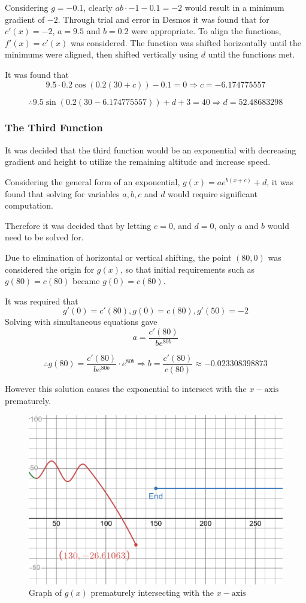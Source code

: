 \documentclass[11pt, letterpaper]{article}
\begin{document}
Considering $g=-0.1$, clearly $ab\cdot -1-0.1=-2$ would result in a minimum gradient of $-2$. Through trial and error in Desmos it was found that for $c'(x)=-2$, $a=9.5$ and $b=0.2$ were appropriate. To align the functions, $f'(x)=c'(x)$ was considered. The function was shifted horizontally until the minimums were aligned, then shifted vertically using $d$ until the functions met.  

It was found  that $$9.5\cdot0.2\cos (0.2(30+c))-0.1=0 \Rightarrow c=-6.174775557$$

$$\therefore 9.5\sin(0.2(30-6.174775557))+d+3=40 \Rightarrow d=52.48683298$$

\subsubsection{The Third Function}
It was decided that the third function would be an exponential with decreasing gradient and height to utilize the remaining altitude and increase speed.

 Considering the general form of an exponential, $g(x)=ae^{b(x+c)}+d$, it was found that solving for variables $a, b, c$ and $d$ would require significant computation.

Therefore it was decided that by letting $c=0$, and $d=0$, only $a$ and $b$ would need to be solved for. 

Due to elimination of horizontal or vertical shifting, the point $(80, 0)$ was considered the origin for $g(x)$, so that  initial requirements such as $g(80)=c(80)$ became $g(0)=c(80)$. 

It was required that $$g'(0)=c'(80),g(0)=c(80), g'(50)=-2$$
Solving with simultaneous equations gave $$a=\frac{c'(80)}{be^{80b}}$$ 

$$\therefore g(80)=\frac{c'(80)}{be^{80b}}\cdot e^{80b}\Rightarrow b=\frac{c'(80)}{c(80)}\approx -0.023308398873$$

However this solution causes the exponential to intersect with the $x-\textrm{axis}$ prematurely. 
	\begin{figure}[h]
		\centering
		\includegraphics[width=15cm]{PrematureIntersecion.png}
		\caption{Graph of $g(x)$ prematurely intersecting with the $x-\textrm{axis}$}
	\end{figure}
\end{document}

